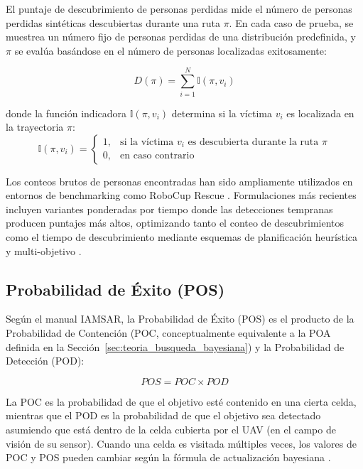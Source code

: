 El puntaje de descubrimiento de personas perdidas mide el número de personas perdidas sintéticas descubiertas durante una ruta $\pi$. En cada caso de prueba, se muestrea un número fijo de personas perdidas de una distribución predefinida, y $\pi$ se evalúa basándose en el número de personas localizadas exitosamente:

\begin{equation}
D(\pi) = \sum_{i=1}^{N} \mathbb{I}(\pi, v_i)
\end{equation}

donde la función indicadora $\mathbb{I}(\pi, v_i)$ determina si la víctima $v_i$ es localizada en la trayectoria $\pi$:
\begin{equation}
\mathbb{I}(\pi, v_i) = \begin{cases} 
1, & \text{si la víctima } v_i \text{ es descubierta durante la ruta } \pi \\
0, & \text{en caso contrario}
\end{cases}
\end{equation}

Los conteos brutos de personas encontradas han sido ampliamente utilizados en entornos de benchmarking como RoboCup Rescue \cite{kohlbrecher2015}. Formulaciones más recientes incluyen variantes ponderadas por tiempo donde las detecciones tempranas producen puntajes más altos, optimizando tanto el conteo de descubrimientos como el tiempo de descubrimiento mediante esquemas de planificación heurística y multi-objetivo \cite{trojanowski2024}.

\subsection{Probabilidad de Éxito (POS)}

Según el manual IAMSAR, la Probabilidad de Éxito (POS) es el producto de la Probabilidad de Contención (POC, conceptualmente equivalente a la POA definida en la Sección~\ref{sec:teoria_busqueda_bayesiana}) y la Probabilidad de Detección (POD):

\begin{equation}
POS = POC \times POD
\end{equation}

La POC es la probabilidad de que el objetivo esté contenido en una cierta celda, mientras que el POD es la probabilidad de que el objetivo sea detectado asumiendo que está dentro de la celda cubierta por el UAV (en el campo de visión de su sensor). Cuando una celda es visitada múltiples veces, los valores de POC y POS pueden cambiar según la fórmula de actualización bayesiana \cite{koopman1980, stone2006}.

